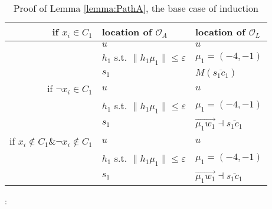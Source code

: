 \documentclass[a4paper,UKenglish]{lipics}
\newcommand{\eps}{\varepsilon}
\newcommand{\CO}{{\mathscr O}}
\newcommand{\Seg}[1]{{\overline{#1}}}
\newcommand{\Dir}{\overrightarrow}
\begin{document}
\begin{table}[h]
\centering
\begin{tabular}{ r | l | l  }
if $x_i \in C_1$   & location of $\CO_A$ & location of $\CO_L$  
 \\
\hline
    
&  $u$ & $u$  \\
&  				 $h_1$ s.t.  $\| h_1\mu_1 \| \le \eps$ & $\mu_1 = (-4,-1)$\\

& $s_1 $  & $M(\Seg{s_1c_1})$	      \\

\hline
if $\neg x_i \in C_1$ 
&  $u$ & $u$  \\
&  				 $h_1$ s.t.  $\| h_1\mu_1 \| \le \eps$ & $\mu_1 = (-4,-1)$\\

& $s_1$ &  $ \Dir{\mu_1w_1} \dashv	 \Seg{s_1c_1} $\\

\hline
if $x_i \notin C_{1} \& \neg x_i \notin C_{1}$ & $u$ & $u$  \\
&  				 $h_1$ s.t.  $\| h_1\mu_1 \| \le \eps$ & $\mu_1 = (-4,-1)$\\
& $s_1$ &  $ \Dir{\mu_1w_1} \dashv	 \Seg{s_1c_1} $\\

\end{tabular}
\vspace{0.2 in}
\caption{Proof of Lemma \ref{lemma:PathA}, the base case of induction}
\label{tab:BaseCasePathA}
\end{table}







:
\end{document}
